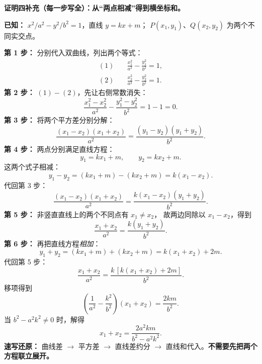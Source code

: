 \begin{proofbox}
\textbf{证明四补充（每一步写全）：从“两点相减”得到横坐标和。}

\textbf{已知：} $x^2/a^2-y^2/b^2=1$，直线 $y=kx+m$；
$P(x_1,y_1)$、$Q(x_2,y_2)$ 为两个不同实交点。

\textbf{第 1 步：} 分别代入双曲线，列出两个等式：
\[
\begin{aligned}
 (1)\quad &\frac{x_1^2}{a^2}-\frac{y_1^2}{b^2}=1,\\
 (2)\quad &\frac{x_2^2}{a^2}-\frac{y_2^2}{b^2}=1.
\end{aligned}
\]
\textbf{第 2 步：} $(1)-(2)$，先让右侧常数消失：
\[
 \frac{x_1^2-x_2^2}{a^2}-\frac{y_1^2-y_2^2}{b^2}=1-1=0.
\]
\textbf{第 3 步：} 将两个平方差分别分解：
\[
 \frac{(x_1-x_2)(x_1+x_2)}{a^2}
 =\frac{(y_1-y_2)(y_1+y_2)}{b^2}.
\]
\textbf{第 4 步：} 两点分别满足直线方程：
\[
 y_1=kx_1+m,\qquad y_2=kx_2+m.
\]
这两个式子相减：
\[
 y_1-y_2=(kx_1+m)-(kx_2+m)=k(x_1-x_2).
\]
代回第 3 步：
\[
 \frac{(x_1-x_2)(x_1+x_2)}{a^2}
 =\frac{k(x_1-x_2)(y_1+y_2)}{b^2}.
\]
\textbf{第 5 步：} 非竖直直线上的两个不同点有 $x_1\ne x_2$，
故两边同除以 $x_1-x_2$，得到
\[
 \boxed{\frac{x_1+x_2}{a^2}=\frac{k(y_1+y_2)}{b^2}}.
\]
\textbf{第 6 步：} 再把直线方程\emph{相加}：
\[
 y_1+y_2=(kx_1+m)+(kx_2+m)=k(x_1+x_2)+2m.
\]
代回第 5 步：
\[
 \frac{x_1+x_2}{a^2}
 =\frac{k\,[k(x_1+x_2)+2m]}{b^2}.
\]
移项得到
\[
 \left(\frac1{a^2}-\frac{k^2}{b^2}\right)(x_1+x_2)
 =\frac{2km}{b^2}.
\]
当 $b^2-a^2k^2\ne0$ 时，解得
\[
 \boxed{x_1+x_2=\frac{2a^2km}{b^2-a^2k^2}}.
\]
\textbf{速写还原：} 曲线差 $\to$ 平方差 $\to$ 直线差约分
$\to$ 直线和代入。\textbf{不需要先把两个方程联立展开。}
\end{proofbox}
\clearpage

